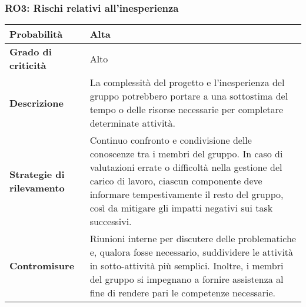 \noindent\begin{minipage}{\textwidth}
\subsubsection{RO3: Rischi relativi all'inesperienza}
    
\bgroup
\begin{adjustwidth}{-0.5cm}{-0.5cm}
    \begin{longtable}{P{4.5cm}|>{\justifying \arraybackslash}P{9cm}}

        \textbf{Probabilità} & Alta \\
        \hline
        \textbf{Grado di criticità} & Alto \\
        \hline
        \textbf{Descrizione} & La complessità del progetto e l’inesperienza del gruppo potrebbero
        portare a una sottostima del tempo o delle risorse necessarie per completare
        determinate attività. \\
        \hline
        \textbf{Strategie di rilevamento} &  Continuo confronto e condivisione delle conoscenze
        tra i membri del gruppo. In caso di valutazioni errate o difficoltà nella gestione
        del carico di lavoro, ciascun componente deve informare tempestivamente il
        resto del gruppo, così da mitigare gli impatti negativi sui task successivi. \\
        \hline
        \textbf{Contromisure} & Riunioni interne per discutere delle problematiche e, qualora fosse necessario, suddividere le attività in sotto-attività più semplici. Inoltre, i membri del gruppo si impegnano a fornire assistenza al fine di rendere pari le competenze necessarie.
    \end{longtable}
\end{adjustwidth}
\egroup
\end{minipage}
